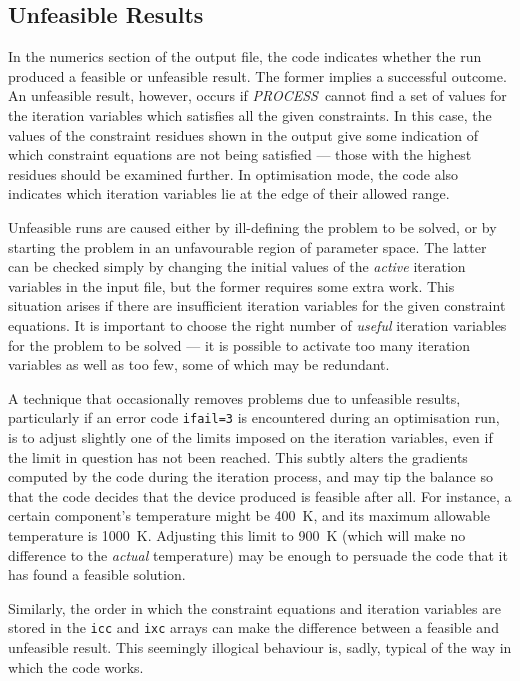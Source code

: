 \documentclass[11pt,a4paper]{report}
\newcommand{\PS}{\mbox{\it PROCESS\/ }}
\begin{document}
\subsection{Unfeasible Results}

In the numerics section of the output file, the code indicates whether the run
produced a feasible or unfeasible result. The former implies a successful
outcome. An unfeasible result, however, occurs if \PS cannot find a set of
values for the iteration variables which satisfies all the given
constraints. In this case, the values of the constraint residues shown in the
output give some indication of which constraint equations are not being
satisfied --- those with the highest residues should be examined further. In
optimisation mode, the code also indicates which iteration variables lie at
the edge of their allowed range.

Unfeasible runs are caused either by ill-defining the problem to be solved, or
by starting the problem in an unfavourable region of parameter space. The
latter can be checked simply by changing the initial values of the {\em
active}\/ iteration variables in the input file, but the former requires some
extra work. This situation arises if there are insufficient iteration
variables for the given constraint equations. It is important to choose the
right number of {\em useful}\/ iteration variables for the problem to be
solved --- it is possible to activate too many iteration variables as well as
too few, some of which may be redundant.

A technique that occasionally removes problems due to unfeasible results,
particularly if an error code {\tt ifail=3} is encountered during an
optimisation run, is to adjust slightly one of the limits imposed on the
iteration variables, even if the limit in question has not been reached. This
subtly alters the gradients computed by the code during the iteration process,
and may tip the balance so that the code decides that the device produced is
feasible after all. For instance, a certain component's temperature might be
400~K, and its maximum allowable temperature is 1000~K\@. Adjusting this limit
to 900~K (which will make no difference to the {\em actual}\/ temperature) may
be enough to persuade the code that it has found a feasible solution.

Similarly, the order in which the constraint equations and iteration variables
are stored in the {\tt icc} and {\tt ixc} arrays can make the difference
between a feasible and unfeasible result. This seemingly illogical behaviour
is, sadly, typical of the way in which the code works.
\end{document}
